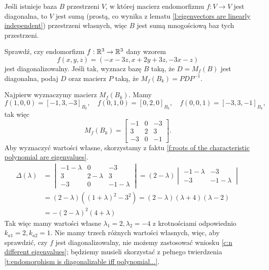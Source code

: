 \begin{remark}
    \label{r:about base of diagonal matrix of endomorphism}
    Jeśli istnieje baza $B$ przestrzeni $V$, w której macierz endomorfizmu $f: V \to V$ jest diagonalna, to $V$ jest sumą (prostą, co wynika z lematu \ref{l:eigenvectors are linearly independent}) przestrzeni własnych, więc $B$ jest sumą mnogościową baz tych przestrzeni.
\end{remark}

\begin{example}
    Sprawdź, czy endomorfizm $f : \mathbb R^3 \to \mathbb R^3$ dany wzorem
    \[ f(x, y, z) = (-x-3z, x + 2y + 3z, -3x - z) \]
    jest diagonalizowalny. Jeśli tak, wyznacz bazę $B$ taką, że $D = M_f(B)$ jest diagonalna, podaj $D$ oraz macierz $P$ taką, że $M_f(B_k) = PDP^{-1}$.
\end{example}
\begin{solution}
    Najpierw wyznaczymy macierz $M_f(B_k)$. Mamy
    \[ f(1, 0, 0) = [-1, 3, -3]_{B_k}, \quad f(0, 1, 0) = [0, 2, 0]_{B_k}, \quad f(0, 0, 1) = [-3, 3, -1]_{B_k}, \]
    tak więc
    \[ M_f(B_k) = \begin{bmatrix}
        -1 & 0 & -3 \\
        3 & 2 & 3 \\
        -3 & 0 & -1
    \end{bmatrix}. \]
    Aby wyznaczyć wartości własne, skorzystamy z faktu \ref{f:roots of the characteristic polynomial are eigenvalues}.
    \begin{align*} \Delta(\lambda) &=
        \begin{vmatrix}
            -1 - \lambda & 0 & -3 \\
            3 & 2 - \lambda & 3 \\
            -3 & 0 & -1 - \lambda
        \end{vmatrix} = (2 - \lambda) \begin{vmatrix}
            -1 - \lambda & -3 \\
            -3 & -1 - \lambda
        \end{vmatrix} \\
        &= (2 - \lambda)((1 + \lambda)^2 - 3^2) = (2 - \lambda)(\lambda + 4)(\lambda - 2) \\
        &= -(2 - \lambda)^2(4 + \lambda)
    \end{align*}
    Tak więc mamy wartości własne $\lambda_1 = 2, \lambda_2 = -4$ z krotnościami odpowiednio $k_{a1} = 2, k_{a2} = 1$. Nie mamy trzech różnych wartości własnych, więc, aby sprawdzić, czy $f$ jest diagonalizowalny, nie możemy zastosować wniosku \ref{c:n different eigenvalues}; będziemy musieli skorzystać z pełnego twierdzenia \ref{t:endomorphism is diagonalizable iff polynomial...}.


\end{solution}
